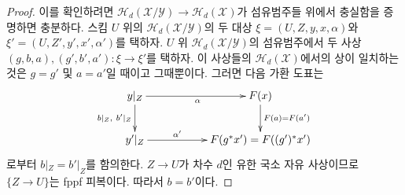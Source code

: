 \begin{proof}
이를 확인하려면 $\mathcal{H}_d(\mathcal{X}/\mathcal{Y}) \to
\mathcal{H}_d(\mathcal{X})$가 섬유범주들 위에서 충실함을 증명하면 충분하다.
스킴 $U$ 위의 $\mathcal{H}_d(\mathcal{X}/\mathcal{Y})$의 두 대상
$\xi = (U, Z, y, x, \alpha)$와 $\xi' = (U, Z', y', x', \alpha')$를
택하자. $U$ 위 $\mathcal{H}_d(\mathcal{X}/\mathcal{Y})$의 섬유범주에서 두 사상
$(g, b, a), (g', b', a') : \xi \to \xi'$를 택하자.
이 사상들의 $\mathcal{H}_d(\mathcal{X})$에서의 상이 일치하는 것은
$g = g'$ 및 $a = a'$일 때이고 그때뿐이다. 그러면 다음 가환 도표는
$$
\xymatrix{
y|_Z \ar[rr]_\alpha \ar[d]_{b|_Z, \ b'|_Z} & &
F(x) \ar[d]^{F(a) = F(a')} \\
y'|_Z \ar[rr]^-{\alpha'} & &
F(g^*x') = F((g')^*x') \\
}
$$
로부터 $b|_Z = b'|_Z$를 함의한다. $Z \to U$가 차수 $d$인 유한 국소 자유
사상이므로 $\{Z \to U\}$는 fppf 피복이다. 따라서 $b = b'$이다.
\end{proof}



















